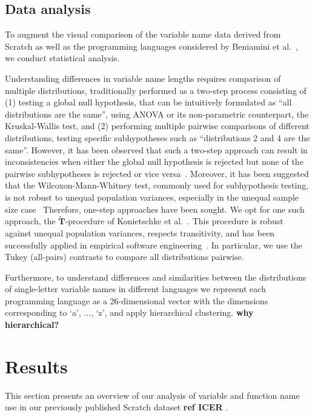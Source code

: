 \documentclass[conference]{IEEEtran}
\newcommand{\todo}[1]{ \textbf{#1} }
\begin{document}
\subsection{Data analysis}
To augment the visual comparison of the variable name data derived from Scratch as well as the programming languages considered by Beniamini et al.~\cite{Beniamini}, we conduct statistical analysis. 

Understanding differences in variable name lengths requires comparison of multiple distributions, traditionally performed as a two-step process consisting of (1) testing a global null hypothesis, that can be intuitively formulated as ``all distributions are the same'', using ANOVA or its non-parametric counterpart, the Kruskal-Wallis test, and (2) performing multiple pairwise comparisons of different distributions, testing specific subhypotheses such as ``distributions 2 and 4 are the same''. 
However, it has been observed that such a two-step approach can result in inconsistencies when either the global null hypothesis is rejected but none of the pairwise subhypotheses is rejected or vice versa~\cite{Gabriel}. 
Moreover, it has been suggested that the Wilcoxon-Mann-Whitney test, commonly used for subhypothesis testing, is not robust to unequal population variances, especially in the unequal sample size case~\cite{Zimmerman:Zumbo}
Therefore, one-step approaches have been sought.
We opt for one such approach, the $\widetilde{\mathbf{T}}$-procedure of Konietschke et al.~\cite{Konietschke:Hothorn:Brunner}. 
This procedure is robust against unequal population variances, respects transitivity, and has been successfully applied in empirical software engineering~\cite{VasilescuSGM14,VasilescuCS14,YuWYW16}.
In particular, we use the Tukey (all-pairs) contrasts to compare all distributions pairwise.

Furthermore, to understand differences and similarities between the distributions of single-letter variable names in different languages we represent each programming language as a 26-dimensional vector with the dimensions corresponding to `a', ..., `z', and apply hierarchical clustering. \todo{why hierarchical?}


 \section{Results}
This section presents an overview of our analysis of variable and function name use in our previously published Scratch dataset \todo{ref ICER}. 
\end{document}

